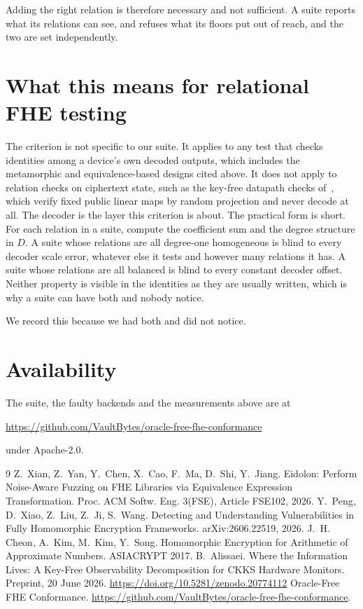 \documentclass[11pt,a4paper]{article}
\begin{document}
Adding the right relation is therefore necessary and not sufficient. A suite reports what its
relations can see, and refuses what its floors put out of reach, and the two are set independently.

\section{What this means for relational FHE testing}

The criterion is not specific to our suite. It applies to any test that checks identities among a
device's own decoded outputs, which includes the metamorphic and equivalence-based designs cited
above. It does not apply to relation checks on ciphertext state, such as the key-free datapath
checks of~\cite{keyfree}, which verify fixed public linear maps by random projection and never
decode at all. The decoder is the layer this criterion is about. The practical form is short. For each relation in a suite, compute the coefficient sum and
the degree structure in $D$. A suite whose relations are all degree-one homogeneous is blind to
every decoder scale error, whatever else it tests and however many relations it has. A suite whose
relations are all balanced is blind to every constant decoder offset. Neither property is visible in
the identities as they are usually written, which is why a suite can have both and nobody notice.

We record this because we had both and did not notice.

\section*{Availability}

The suite, the faulty backends and the measurements above are at
\begin{center}
\url{https://github.com/VaultBytes/oracle-free-fhe-conformance}
\end{center}
under Apache-2.0.

\begin{thebibliography}{9}
 Z.~Xian, Z.~Yan, Y.~Chen, X.~Cao, F.~Ma, D.~Shi, Y.~Jiang. Eidolon: Perform
  Noise-Aware Fuzzing on FHE Libraries via Equivalence Expression Transformation. Proc. ACM Softw.
  Eng. 3(FSE), Article FSE102, 2026.
 Y.~Peng, D.~Xiao, Z.~Liu, Z.~Ji, S.~Wang. Detecting and Understanding
  Vulnerabilities in Fully Homomorphic Encryption Frameworks. arXiv:2606.22519, 2026.
 J.~H. Cheon, A.~Kim, M.~Kim, Y.~Song. Homomorphic Encryption for Arithmetic of
  Approximate Numbers. ASIACRYPT 2017.
 B.~Alissaei. Where the Information Lives: A Key-Free Observability Decomposition
  for CKKS Hardware Monitors. Preprint, 20 June 2026. \url{https://doi.org/10.5281/zenodo.20774112}
 Oracle-Free FHE Conformance.
  \url{https://github.com/VaultBytes/oracle-free-fhe-conformance}.
\end{thebibliography}
\end{document}
